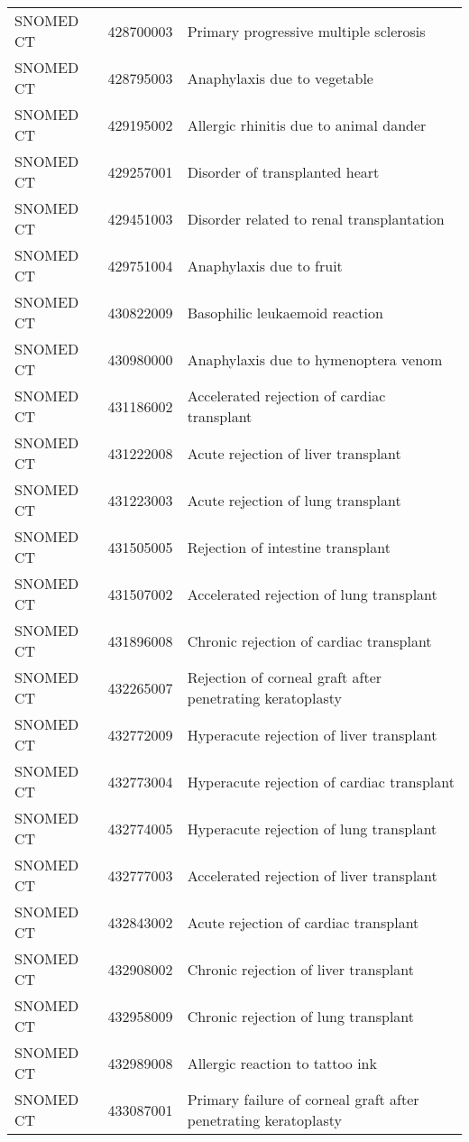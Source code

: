 \begin{longtable}{p{}p{}p{}}
  SNOMED CT & 428700003 & Primary progressive multiple sclerosis \\ 
  SNOMED CT & 428795003 & Anaphylaxis due to vegetable \\ 
  SNOMED CT & 429195002 & Allergic rhinitis due to animal dander \\ 
  SNOMED CT & 429257001 & Disorder of transplanted heart \\ 
  SNOMED CT & 429451003 & Disorder related to renal transplantation \\ 
  SNOMED CT & 429751004 & Anaphylaxis due to fruit \\ 
  SNOMED CT & 430822009 & Basophilic leukaemoid reaction \\ 
  SNOMED CT & 430980000 & Anaphylaxis due to hymenoptera venom \\ 
  SNOMED CT & 431186002 & Accelerated rejection of cardiac transplant \\ 
  SNOMED CT & 431222008 & Acute rejection of liver transplant \\ 
  SNOMED CT & 431223003 & Acute rejection of lung transplant \\ 
  SNOMED CT & 431505005 & Rejection of intestine transplant \\ 
  SNOMED CT & 431507002 & Accelerated rejection of lung transplant \\ 
  SNOMED CT & 431896008 & Chronic rejection of cardiac transplant \\ 
  SNOMED CT & 432265007 & Rejection of corneal graft after penetrating keratoplasty \\ 
  SNOMED CT & 432772009 & Hyperacute rejection of liver transplant \\ 
  SNOMED CT & 432773004 & Hyperacute rejection of cardiac transplant \\ 
  SNOMED CT & 432774005 & Hyperacute rejection of lung transplant \\ 
  SNOMED CT & 432777003 & Accelerated rejection of liver transplant \\ 
  SNOMED CT & 432843002 & Acute rejection of cardiac transplant \\ 
  SNOMED CT & 432908002 & Chronic rejection of liver transplant \\ 
  SNOMED CT & 432958009 & Chronic rejection of lung transplant \\ 
  SNOMED CT & 432989008 & Allergic reaction to tattoo ink \\ 
  SNOMED CT & 433087001 & Primary failure of corneal graft after penetrating keratoplasty \\ 

\end{longtable}
